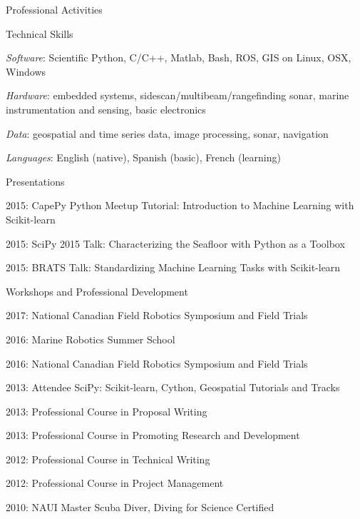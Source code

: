 \documentclass{resume} %
\begin{document}
\begin{rSection}{Professional Activities}

\begin{rSubsection}{Technical Skills}{}{}{}
\item{\emph{Software}: Scientific Python, C/C++, Matlab, Bash, ROS, GIS on Linux, OSX, Windows}
\item{\emph{Hardware}: embedded systems, sidescan/multibeam/rangefinding sonar, marine instrumentation and sensing, basic electronics}
\item{\emph{Data}: geospatial and time series data, image processing, sonar, navigation }
\item{\emph{Languages}: English (native), Spanish (basic), French (learning)}
\end{rSubsection}


\begin{rSubsection}{Presentations}{}{}{}
\item{2015: CapePy Python Meetup Tutorial: Introduction to Machine Learning with Scikit-learn }
\item{2015: SciPy 2015 Talk: Characterizing the Seafloor with Python as a Toolbox}
\item{2015: BRATS Talk: Standardizing Machine Learning Tasks with Scikit-learn }
\end{rSubsection}

\begin{rSubsection}{Workshops and Professional Development}{}{}{}
\item{2017: National Canadian Field Robotics Symposium and Field Trials}
\item{2016: Marine Robotics Summer School}
\item{2016: National Canadian Field Robotics Symposium and Field Trials}
\item{2013: Attendee SciPy: Scikit-learn, Cython, Geospatial Tutorials and Tracks}
\item{2013: Professional Course in Proposal Writing}
\item{2013: Professional Course in Promoting Research and Development}
\item{2012: Professional Course in Technical Writing}
\item{2012: Professional Course in Project Management}
\item{2010: NAUI Master Scuba Diver, Diving for Science Certified}
\end{rSubsection}



\end{rSection}
\end{document}
